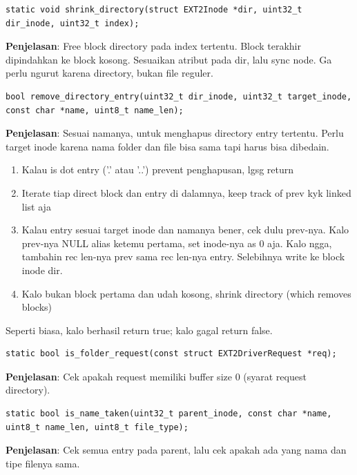 \begin{lstlisting}
static void shrink_directory(struct EXT2Inode *dir, uint32_t dir_inode, uint32_t index);
\end{lstlisting}

\textbf{Penjelasan}: Free block directory pada index tertentu. Block terakhir dipindahkan ke block kosong. Sesuaikan atribut pada dir, lalu sync node. Ga perlu ngurut karena directory, bukan file reguler.

\begin{lstlisting}
bool remove_directory_entry(uint32_t dir_inode, uint32_t target_inode, const char *name, uint8_t name_len);
\end{lstlisting}

\textbf{Penjelasan}:
Sesuai namanya, untuk menghapus directory entry tertentu. Perlu target inode karena nama folder dan file bisa sama tapi harus bisa dibedain.

\begin{enumerate}
    \item Kalau is dot entry ('.' atau '..') prevent penghapusan, lgsg return
    \item Iterate tiap direct block dan entry di dalamnya, keep track of prev kyk linked list aja
    \item Kalau entry sesuai target inode dan namanya bener, cek dulu prev-nya. Kalo prev-nya NULL alias ketemu pertama, set inode-nya as 0 aja. Kalo ngga, tambahin rec len-nya prev sama rec len-nya entry. Selebihnya write ke block inode dir.
    \item Kalo bukan block pertama dan udah kosong, shrink directory (which removes blocks)
\end{enumerate}
Seperti biasa, kalo berhasil return true; kalo gagal return false.

\begin{lstlisting}
static bool is_folder_request(const struct EXT2DriverRequest *req);
\end{lstlisting}

\textbf{Penjelasan}: Cek apakah request memiliki buffer size 0 (syarat request directory).

\begin{lstlisting}
static bool is_name_taken(uint32_t parent_inode, const char *name, uint8_t name_len, uint8_t file_type);
\end{lstlisting}

\textbf{Penjelasan}: Cek semua entry pada parent, lalu cek apakah ada yang nama dan tipe filenya sama.

